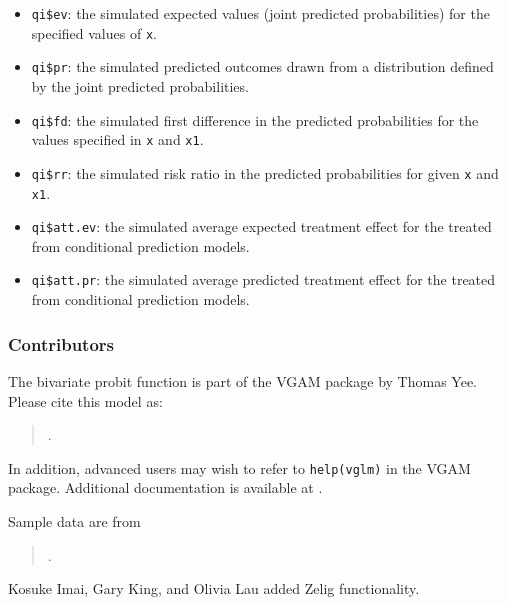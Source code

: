 \begin{itemize}
   \begin{itemize}
   \item {\tt qi\$ev}: the simulated expected values (joint predicted
     probabilities) for the specified values of {\tt x}.
   \item {\tt qi\$pr}: the simulated predicted outcomes drawn from a
     distribution defined by the joint predicted probabilities.
   \item {\tt qi\$fd}: the simulated first difference in the predicted
     probabilities for the values specified in {\tt x} and {\tt x1}.
   \item {\tt qi\$rr}: the simulated risk ratio in the predicted
     probabilities for given {\tt x} and {\tt x1}.
   \item {\tt qi\$att.ev}: the simulated average expected treatment
     effect for the treated from conditional prediction models.  
   \item {\tt qi\$att.pr}: the simulated average predicted treatment
     effect for the treated from conditional prediction models.  
   \end{itemize}
\end{itemize}

\subsubsection{Contributors}

The bivariate probit function is part of the VGAM package by Thomas Yee.
Please cite this model as:
\begin{verse}
.
\end{verse}

In addition, advanced users may wish to refer to \texttt{help(vglm)}
in the VGAM package.  Additional documentation is available at
.

Sample data are from 
\begin{verse}
.
\end{verse}
Kosuke Imai, Gary King, and Olivia Lau added Zelig functionality.  






